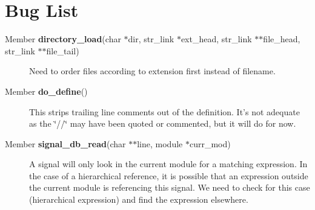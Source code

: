 \section{Bug List}\label{bug}
\begin{description}
\item[\label{_bug000003}
Member {\bf directory\_\-load}(char $\ast$dir, str\_\-link $\ast$ext\_\-head, str\_\-link $\ast$$\ast$file\_\-head, str\_\-link $\ast$$\ast$file\_\-tail) ]
Need to order files according to extension first instead of filename.\end{description}


\begin{description}
\item[\label{_bug000001}
Member {\bf do\_\-define}() ]
This strips trailing line comments out of the definition. It's not adequate as the \char`\"{}//\char`\"{} may have been quoted or commented, but it will do for now.\end{description}


\begin{description}
\item[\label{_bug000002}
Member {\bf signal\_\-db\_\-read}(char $\ast$$\ast$line, module $\ast$curr\_\-mod) ]
A signal will only look in the current module for a matching expression. In the case of a hierarchical reference, it is possible that an expression outside the current module is referencing this signal. We need to check for this case (hierarchical expression) and find the expression elsewhere.\end{description}
 